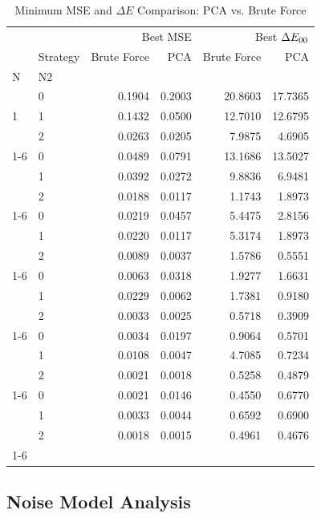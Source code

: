 \begin{table}[H]
    \centering
    \begin{tabular}{llrrrr}
    \toprule
     &  & \multicolumn{2}{r}{Best MSE} & \multicolumn{2}{r}{Best $\Delta E_{00}$} \\
     & Strategy & Brute Force & PCA & Brute Force & PCA \\
    N & N2 &  &  &  &  \\
    \midrule
    \multirow[t]{3}{*}{1} & 0 & 0.1904 & 0.2003 & 20.8603 & 17.7365 \\
      & 1 & 0.1432 & 0.0500 & 12.7010 & 12.6795 \\
      & 2 & 0.0263 & 0.0205 & 7.9875 & 4.6905 \\
    \cline{1-6}
    \multirow[t]{3}{*}{2} & 0 & 0.0489 & 0.0791 & 13.1686 & 13.5027 \\
      & 1 & 0.0392 & 0.0272 & 9.8836 & 6.9481 \\
      & 2 & 0.0188 & 0.0117 & 1.1743 & 1.8973 \\
    \cline{1-6}
    \multirow[t]{3}{*}{3} & 0 & 0.0219 & 0.0457 & 5.4475 & 2.8156 \\
      & 1 & 0.0220 & 0.0117 & 5.3174 & 1.8973 \\
      & 2 & 0.0089 & 0.0037 & 1.5786 & 0.5551 \\
    \cline{1-6}
    \multirow[t]{3}{*}{4} & 0 & 0.0063 & 0.0318 & 1.9277 & 1.6631 \\
      & 1 & 0.0229 & 0.0062 & 1.7381 & 0.9180 \\
      & 2 & 0.0033 & 0.0025 & 0.5718 & 0.3909 \\
    \cline{1-6}
    \multirow[t]{3}{*}{5} & 0 & 0.0034 & 0.0197 & 0.9064 & 0.5701 \\
      & 1 & 0.0108 & 0.0047 & 4.7085 & 0.7234 \\
      & 2 & 0.0021 & 0.0018 & 0.5258 & 0.4879 \\
    \cline{1-6}
    \multirow[t]{3}{*}{6} & 0 & 0.0021 & 0.0146 & 0.4550 & 0.6770 \\
      & 1 & 0.0033 & 0.0044 & 0.6592 & 0.6900 \\
      & 2 & 0.0018 & 0.0015 & 0.4961 & 0.4676 \\
    \cline{1-6}
    \bottomrule
    \end{tabular}
    \caption{Minimum MSE and $\Delta E$ Comparison: PCA vs. Brute Force}
    \label{tab:mse_deltae_comparison}
\end{table}


\subsection{Noise Model Analysis}

